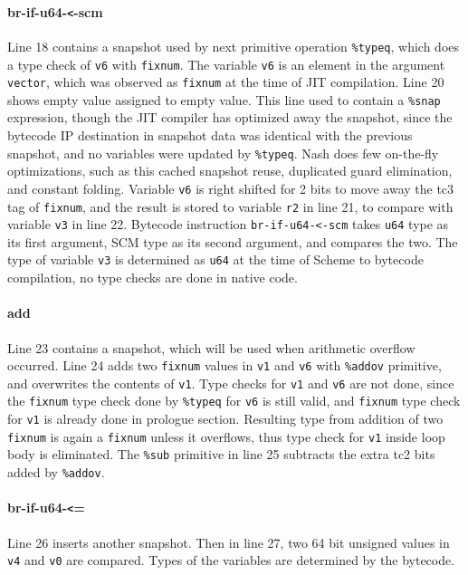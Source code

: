 \documentclass[preprint, 10pt]{sigplanconf}
\begin{document}
\paragraph{br-if-u64-\texttt{<}-scm} Line 18 contains a snapshot used by next
primitive operation \texttt{\%typeq}, which does a type check of \texttt{v6}
with \texttt{fixnum}. The variable \texttt{v6} is an element in the argument
\texttt{vector}, which was observed as \texttt{fixnum} at the time of JIT
compilation. Line 20 shows empty value assigned to empty value. This line used
to contain a \texttt{\%snap} expression, though the JIT compiler has optimized
away the snapshot, since the bytecode IP destination in snapshot data was
identical with the previous snapshot, and no variables were updated by
\texttt{\%typeq}. Nash does few on-the-fly optimizations, such as this cached
snapshot reuse, duplicated guard elimination, and constant folding.  Variable
\texttt{v6} is right shifted for 2 bits to move away the tc3 tag of
\texttt{fixnum}, and the result is stored to variable \texttt{r2} in line 21,
to compare with variable \texttt{v3} in line 22. Bytecode instruction
\texttt{br-if-u64-<-scm} takes \texttt{u64} type as its first argument, SCM
type as its second argument, and compares the two. The type of variable
\texttt{v3} is determined as \texttt{u64} at the time of Scheme to bytecode
compilation, no type checks are done in native code.

\paragraph{add} Line 23 contains a snapshot, which will be used
when arithmetic overflow occurred. Line 24 adds two \texttt{fixnum} values in
\texttt{v1} and \texttt{v6} with \texttt{\%addov} primitive, and overwrites
the contents of \texttt{v1}. Type checks for \texttt{v1} and \texttt{v6} are
not done, since the \texttt{fixnum} type check done by \texttt{\%typeq} for
\texttt{v6} is still valid, and \texttt{fixnum} type check for \texttt{v1} is
already done in prologue section. Resulting type from addition of two
\texttt{fixnum} is again a \texttt{fixnum} unless it overflows, thus type
check for \texttt{v1} inside loop body is eliminated. The \texttt{\%sub}
primitive in line 25 subtracts the extra tc2 bits added by \texttt{\%addov}.

\paragraph{br-if-u64-\texttt{<}=} Line 26 inserts another snapshot. Then in
line 27, two 64 bit unsigned values in \texttt{v4} and \texttt{v0} are
compared. Types of the variables are determined by the bytecode.
\end{document}
